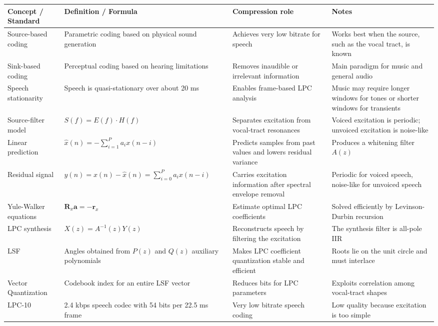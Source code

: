 \begin{center}
\begin{tabular}{|l|l|l|l|}
\hline
\textbf{Concept / Standard} & \textbf{Definition / Formula} & \textbf{Compression role} & \textbf{Notes} \\ \hline
Source-based coding & Parametric coding based on physical sound generation & Achieves very low bitrate for speech & Works best when the source, such as the vocal tract, is known \\ \hline
Sink-based coding & Perceptual coding based on hearing limitations & Removes inaudible or irrelevant information & Main paradigm for music and general audio \\ \hline
Speech stationarity & Speech is quasi-stationary over about 20 ms & Enables frame-based LPC analysis & Music may require longer windows for tones or shorter windows for transients \\ \hline
Source-filter model & $S(f) = E(f) \cdot H(f)$ & Separates excitation from vocal-tract resonances & Voiced excitation is periodic; unvoiced excitation is noise-like \\ \hline
Linear prediction & $\hat{x}(n) = -\sum_{i=1}^{P} a_i x(n-i)$ & Predicts samples from past values and lowers residual variance & Produces a whitening filter $A(z)$ \\ \hline
Residual signal & $y(n) = x(n)-\hat{x}(n)=\sum_{i=0}^{P}a_i x(n-i)$ & Carries excitation information after spectral envelope removal & Periodic for voiced speech, noise-like for unvoiced speech \\ \hline
Yule-Walker equations & $\mathbf{R}_x\mathbf{a}=-\mathbf{r}_x$ & Estimate optimal LPC coefficients & Solved efficiently by Levinson-Durbin recursion \\ \hline
LPC synthesis & $X(z)=A^{-1}(z)Y(z)$ & Reconstructs speech by filtering the excitation & The synthesis filter is all-pole IIR \\ \hline
LSF & Angles obtained from $P(z)$ and $Q(z)$ auxiliary polynomials & Makes LPC coefficient quantization stable and efficient & Roots lie on the unit circle and must interlace \\ \hline
Vector Quantization & Codebook index for an entire LSF vector & Reduces bits for LPC parameters & Exploits correlation among vocal-tract shapes \\ \hline
LPC-10 & 2.4 kbps speech codec with 54 bits per 22.5 ms frame & Very low bitrate speech coding & Low quality because excitation is too simple \\ \hline

\end{tabular}
\end{center}
